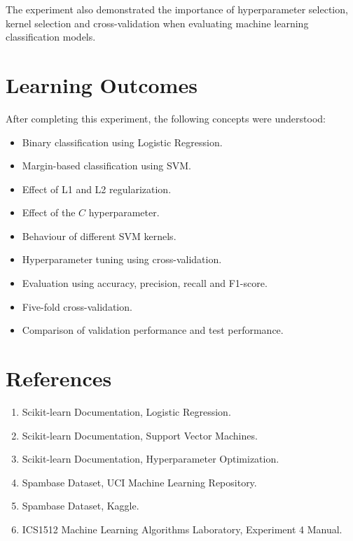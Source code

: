 \documentclass[12pt,a4paper]{article}
\begin{document}
The experiment also demonstrated the importance of hyperparameter
selection, kernel selection and cross-validation when evaluating
machine learning classification models.


\section{Learning Outcomes}

After completing this experiment, the following concepts were
understood:

\begin{itemize}
    \item Binary classification using Logistic Regression.
    \item Margin-based classification using SVM.
    \item Effect of L1 and L2 regularization.
    \item Effect of the $C$ hyperparameter.
    \item Behaviour of different SVM kernels.
    \item Hyperparameter tuning using cross-validation.
    \item Evaluation using accuracy, precision, recall and F1-score.
    \item Five-fold cross-validation.
    \item Comparison of validation performance and test performance.
\end{itemize}


\section{References}

\begin{enumerate}
    \item Scikit-learn Documentation, Logistic Regression.
    
    \item Scikit-learn Documentation, Support Vector Machines.
    
    \item Scikit-learn Documentation, Hyperparameter Optimization.
    
    \item Spambase Dataset, UCI Machine Learning Repository.
    
    \item Spambase Dataset, Kaggle.
    
    \item ICS1512 Machine Learning Algorithms Laboratory,
    Experiment 4 Manual.
\end{enumerate}
\end{document}
